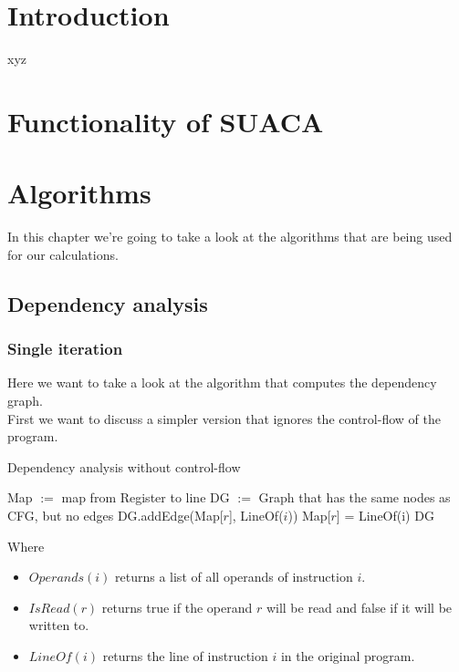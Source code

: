 \documentclass[a4paper,12pt,titlepage, twoside]{report}
\begin{document}
\newpage
\thispagestyle{empty}
\mbox{}

\setcounter{page}{0}
\tableofcontents 


\chapter{Introduction}
xyz

\chapter{Functionality of SUACA}


\chapter{Algorithms}

In this chapter we're going to take a look at the algorithms that are being used for our calculations.

\section{Dependency analysis}

\subsection{Single iteration}

Here we want to take a look at the algorithm that computes the dependency graph. \\
First we want to discuss a simpler version that ignores the control-flow of the program.

\begin{algorithm}[H]
    \SetAlgoLined
    \caption{Dependency analysis without control-flow}
    Map $:=$ map from Register to line\;
    DG $:=$ Graph that has the same nodes as CFG, but no edges\;
     {
          {
              {
                 DG.addEdge(Map[$r$], LineOf($i$))\;
             }{
                Map[$r$] = LineOf(i)\;
            }
        }
    }
    \Return DG\;
\end{algorithm}

Where
\begin{itemize}
    \item $Operands(i)$ returns a list of all operands of instruction $i$.
    \item $IsRead(r)$ returns true if the operand $r$ will be read and false if it will be written to.
    \item $LineOf(i)$ returns the line of instruction $i$ in the original program.
\end{itemize}
\end{document}
